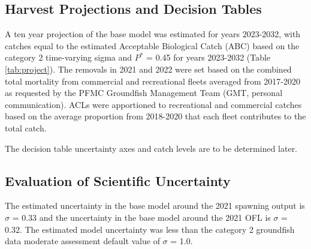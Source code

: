 \documentclass[11pt,
  english,
  a4paper,
]{article}
\begin{document}
\leavevmode\tagmcend\tagstructend\par


\hypertarget{harvest-projections-and-decision-tables}{%
\subsection{Harvest Projections and Decision Tables}\label{harvest-projections-and-decision-tables}}

\leavevmode\tagmcend\tagstructend


A ten year projection of the base model was estimated for years 2023-2032, with catches equal to the estimated Acceptable Biological Catch (ABC) based on the category 2 time-varying sigma and {\(P^*\)\leavevmode\tagmcend\tagstructend} = 0.45 for years 2023-2032 (Table \ref{tab:project}). The removals in 2021 and 2022 were set based on the combined total mortality from commercial and recreational fleets averaged from 2017-2020 as requested by the PFMC Groundfish Management Team (GMT, personal communication). ACLs were apportioned to recreational and commercial catches based on the average proportion from 2018-2020 that each fleet contributes to the total catch.

\leavevmode\tagmcend\tagstructend\par


The decision table uncertainty axes and catch levels are to be determined later.

\leavevmode\tagmcend\tagstructend\par


\hypertarget{evaluation-of-scientific-uncertainty}{%
\subsection{Evaluation of Scientific Uncertainty}\label{evaluation-of-scientific-uncertainty}}

\leavevmode\tagmcend\tagstructend


The estimated uncertainty in the base model around the 2021 spawning output is {\(\sigma\)\leavevmode\tagmcend\tagstructend} = 0.33 and the uncertainty in the base model around the 2021 OFL is {\(\sigma\)\leavevmode\tagmcend\tagstructend} = 0.32. The estimated model uncertainty was less than the category 2 groundfish data moderate assessment default value of {\(\sigma\)\leavevmode\tagmcend\tagstructend} = 1.0.
\end{document}
